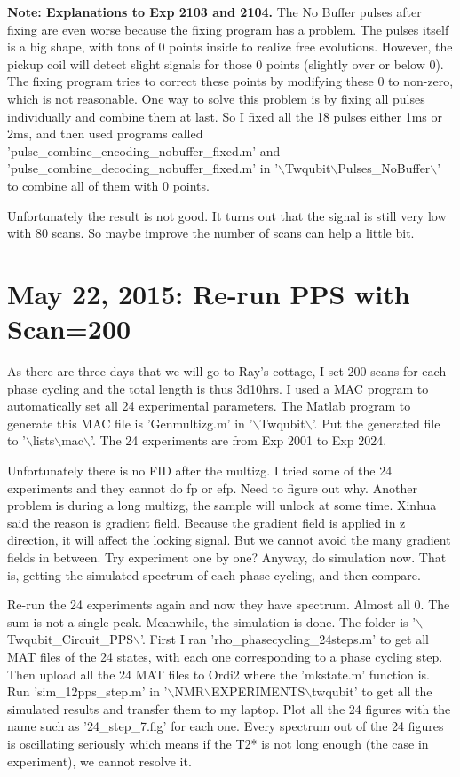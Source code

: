 \documentclass[prl,onecolumn]{revtex4-1}
\newcommand{\dir}{$\backslash$}
\begin{document}
\textbf{Note: Explanations to Exp 2103 and 2104.} The No Buffer pulses after fixing are even worse because the fixing program has a problem. The pulses itself is a big shape, with tons of 0 points inside to realize free evolutions. However, the pickup coil will detect slight signals for those 0 points (slightly over or below 0). The fixing program tries to correct these points by modifying these 0 to non-zero, which is not reasonable. One way to solve this problem is by fixing all pulses individually and combine them at last. So I fixed all the 18 pulses either 1ms or 2ms, and then used programs called 'pulse\_combine\_encoding\_nobuffer\_fixed.m' and 'pulse\_combine\_decoding\_nobuffer\_fixed.m' in '\dir Twqubit\dir Pulses\_NoBuffer\dir' to combine all of them with 0 points.

Unfortunately the result is not good. It turns out that the signal is still very low with 80 scans. So maybe improve the number of scans can help a little bit.

\newpage
\section{May 22, 2015: Re-run PPS with Scan=200}

As there are three days that we will go to Ray's cottage, I set 200 scans for each phase cycling and the total length is thus 3d10hrs. I used a MAC program to automatically set all 24 experimental parameters. The Matlab program to generate this MAC file is 'Genmultizg.m' in '\dir Twqubit\dir'. Put the generated file to '\dir lists\dir mac\dir'. The 24 experiments are from Exp 2001 to Exp 2024.

Unfortunately there is no FID after the multizg. I tried some of the 24 experiments and they cannot do fp or efp. Need to figure out why. Another problem is during a long multizg, the sample will unlock at some time. Xinhua said the reason is gradient field. Because the gradient field is applied in z direction, it will affect the locking signal. But we cannot avoid the many gradient fields in between. Try experiment one by one? Anyway, do simulation now. That is, getting the simulated spectrum of each phase cycling, and then compare.

Re-run the 24 experiments again and now they have spectrum. Almost all 0. The sum is not a single peak. Meanwhile, the simulation is done. The folder is '\dir Twqubit\_Circuit\_PPS\dir'. First I ran 'rho\_phasecycling\_24steps.m' to get all MAT files of the 24 states, with each one corresponding to a phase cycling step. Then upload all the 24 MAT files to Ordi2 where the 'mkstate.m' function is. Run 'sim\_12pps\_step.m' in '\dir NMR\dir EXPERIMENTS\dir twqubit' to get all the simulated results and transfer them to my laptop. Plot all the 24 figures with the name such as '24\_step\_7.fig' for each one. Every spectrum out of the 24 figures is oscillating seriously which means if the T2* is not long enough (the case in experiment), we cannot resolve it.
\end{document}
